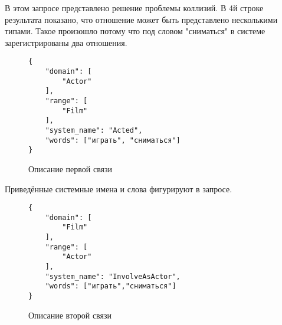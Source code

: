 В этом запросе представлено решение проблемы коллизий.
В 4й строке результата показано, что отношение может быть представлено несколькими типами. Такое произошло потому что под словом "сниматься" в системе зарегистрированы два отношения.
\begin{figure}[!h]
\begin{tcolorbox}[colback=white, sharpish corners]
\begin{verbatim}
{
    "domain": [
        "Actor"
    ],
    "range": [
        "Film"
    ],
    "system_name": "Acted",
    "words": ["играть", "сниматься"]
}
\end{verbatim}
\end{tcolorbox}
\caption{Описание первой связи}
\end{figure}
Приведённые системные имена и слова фигурируют в запросе.
\begin{figure}[!h]
\begin{tcolorbox}[colback=white, sharpish corners]
\begin{verbatim}
{
    "domain": [
        "Film"
    ],
    "range": [
        "Actor"
    ],
    "system_name": "InvolveAsActor",
    "words": ["играть","сниматься"]
}
\end{verbatim}
\end{tcolorbox}
\caption{Описание второй связи}
\end{figure}

